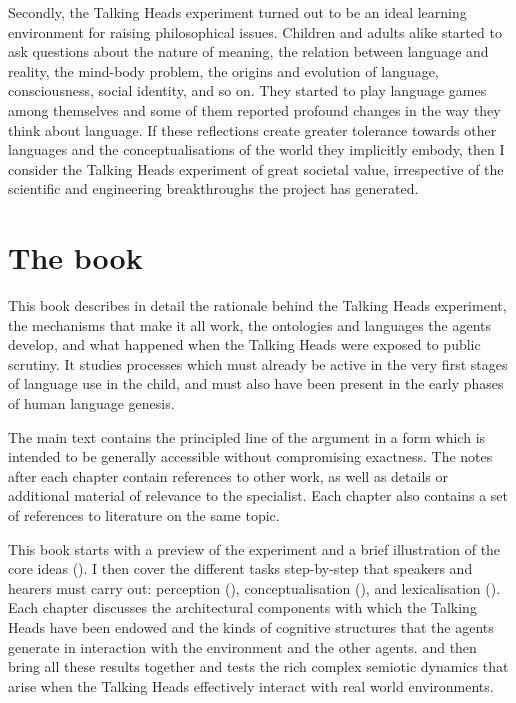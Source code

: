 Secondly, the Talking Heads experiment turned out to be 
an ideal learning environment for raising philosophical
issues. Children and adults alike
started to ask questions about the nature of
meaning, the relation between language
and reality, the mind-body problem, 
the origins and evolution of language, 
consciousness, social identity, and so on. They 
started to play language games among themselves and some of
them reported profound changes in the way they 
think about language. If these reflections create 
greater tolerance towards other languages and 
the conceptualisations of the world
they implicitly embody, then I consider the
Talking Heads experiment of great societal value, irrespective of
the scientific and engineering breakthroughs
the project has generated. 

\section{The book}

This book describes in detail the rationale behind the 
Talking Heads experiment, the mechanisms that make it
all work, the ontologies and 
languages the agents develop, and what happened
when the Talking Heads were exposed to public scrutiny. 
It studies processes which must already be active in the 
very first stages of language use in the child, and 
must also have been present in the early phases of 
human language genesis. 

The main text contains the
principled line of the argument in a form which is intended to be generally
accessible without compromising exactness. The notes after
each chapter contain references to other work, as well 
as details or additional material of relevance to the 
specialist. Each chapter also contains a set of references to
literature on the same topic. 

This book starts with a preview of the 
experiment and a brief illustration of the core ideas (). 
I then cover the 
different tasks step-by-step that speakers and hearers must carry out: 
perception (), conceptualisation (), 
and lexicalisation (). Each 
chapter discusses the 
architectural components with which the Talking Heads 
have been endowed and the kinds of cognitive structures that 
the agents generate in interaction with the environment 
and the other agents.  and  then bring all these 
results together and tests the rich complex semiotic dynamics that 
arise when the Talking Heads effectively interact 
with real world environments. 

